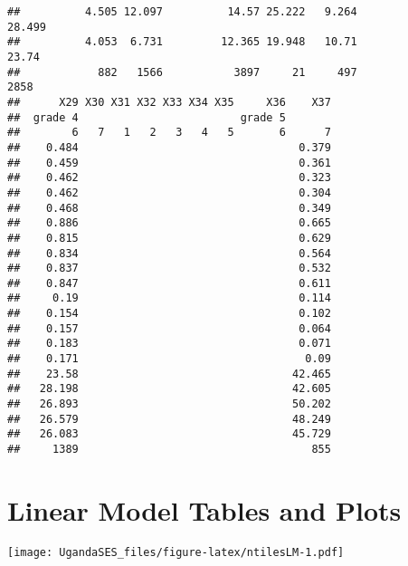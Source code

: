 \documentclass[
]{article}
\begin{document}
\begin{verbatim}
##          4.505 12.097          14.57 25.222   9.264                     28.499
##          4.053  6.731         12.365 19.948   10.71                      23.74
##            882   1566           3897     21     497                       2858
##      X29 X30 X31 X32 X33 X34 X35     X36    X37
##  grade 4                         grade 5       
##        6   7   1   2   3   4   5       6      7
##    0.484                                  0.379
##    0.459                                  0.361
##    0.462                                  0.323
##    0.462                                  0.304
##    0.468                                  0.349
##    0.886                                  0.665
##    0.815                                  0.629
##    0.834                                  0.564
##    0.837                                  0.532
##    0.847                                  0.611
##     0.19                                  0.114
##    0.154                                  0.102
##    0.157                                  0.064
##    0.183                                  0.071
##    0.171                                   0.09
##    23.58                                 42.465
##   28.198                                 42.605
##   26.893                                 50.202
##   26.579                                 48.249
##   26.083                                 45.729
##     1389                                    855
\end{verbatim}

\hypertarget{linear-model-tables-and-plots}{%
\section{Linear Model Tables and
Plots}\label{linear-model-tables-and-plots}}

\texttt{[image: UgandaSES\_files/figure-latex/ntilesLM-1.pdf]}
\end{document}
